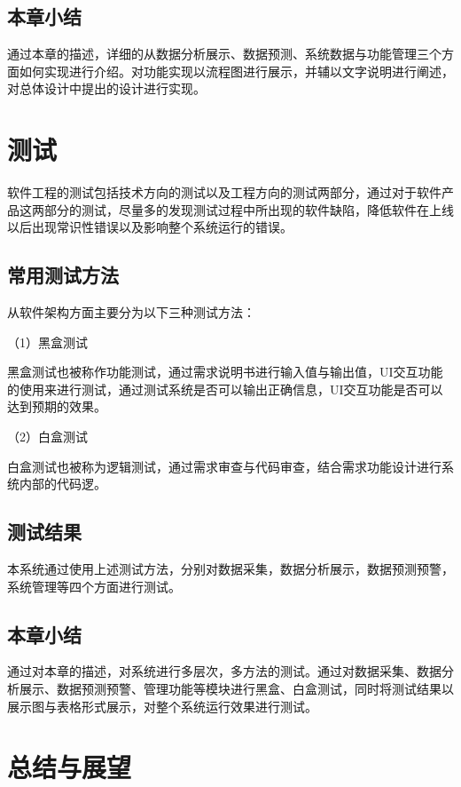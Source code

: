 \documentclass{husethesis}
\begin{document}
\subsection{本章小结}
通过本章的描述，详细的从数据分析展示、数据预测、系统数据与功能管理三个方面如何实现进行介绍。对功能实现以流程图进行展示，并辅以文字说明进行阐述，对总体设计中提出的设计进行实现。
\clearpage


\section{测试}


软件工程的测试包括技术方向的测试以及工程方向的测试两部分，通过对于软件产品这两部分的测试，尽量多的发现测试过程中所出现的软件缺陷，降低软件在上线以后出现常识性错误以及影响整个系统运行的错误。

\subsection{常用测试方法}
从软件架构方面主要分为以下三种测试方法：

（1）黑盒测试

黑盒测试也被称作功能测试，通过需求说明书进行输入值与输出值，UI交互功能的使用来进行测试，通过测试系统是否可以输出正确信息，UI交互功能是否可以达到预期的效果。

（2）白盒测试

白盒测试也被称为逻辑测试，通过需求审查与代码审查，结合需求功能设计进行系统内部的代码逻。

\subsection{测试结果}
本系统通过使用上述测试方法，分别对数据采集，数据分析展示，数据预测预警，系统管理等四个方面进行测试。

\subsection{本章小结}
通过对本章的描述，对系统进行多层次，多方法的测试。通过对数据采集、数据分析展示、数据预测预警、管理功能等模块进行黑盒、白盒测试，同时将测试结果以展示图与表格形式展示，对整个系统运行效果进行测试。
\clearpage


\section{总结与展望}
\end{document}
